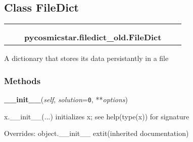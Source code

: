
\subsection{Class FileDict}

    \label{pycosmicstar:filedict_old:FileDict}
\begin{tabular}{cccccc}
\multicolumn{2}{r}{\settowidth{\BCL}{object}\multirow{2}{\BCL}{object}}
&&
  \\\cline{3-3}
  &&\multicolumn{1}{c|}{}
&&
  \\
&&\multicolumn{2}{l}{\textbf{pycosmicstar.filedict\_old.FileDict}}
\end{tabular}

A dictionary that stores its data persistantly in a file



  \subsubsection{Methods}

    \vspace{0.5ex}

\hspace{.8\funcindent}\begin{boxedminipage}{\funcwidth}

    \raggedright \textbf{\_\_init\_\_}(\textit{self}, \textit{solution}={\tt 0}, **\textit{options})

\setlength{\parskip}{2ex}
    x.\_\_init\_\_(...) initializes x; see help(type(x)) for signature

\setlength{\parskip}{1ex}
      Overrides: object.\_\_init\_\_ 	extit{(inherited documentation)}

    \end{boxedminipage}

    \label{pycosmicstar:filedict_old:FileDict:get}

